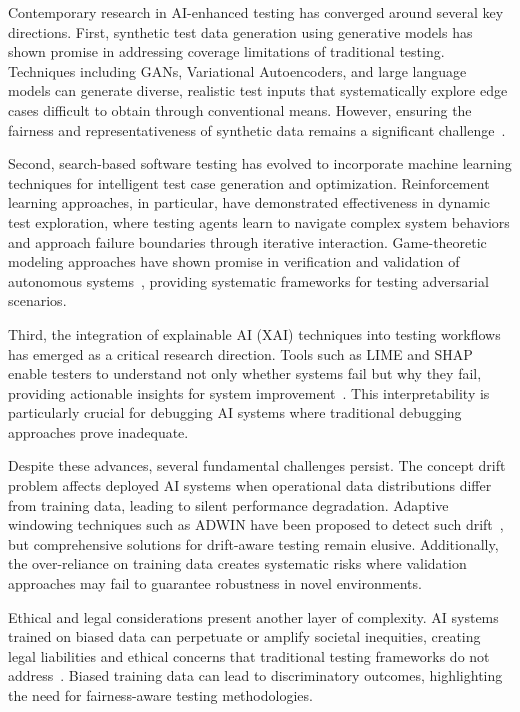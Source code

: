 \documentclass[manuscript,screen,review]{acmart}
\begin{document}
Contemporary research in AI-enhanced testing has converged around several key directions. First, synthetic test data generation using generative models has shown promise in addressing coverage limitations of traditional testing. Techniques including GANs, Variational Autoencoders, and large language models can generate diverse, realistic test inputs that systematically explore edge cases difficult to obtain through conventional means. However, ensuring the fairness and representativeness of synthetic data remains a significant challenge~\cite{Kenfack2021}.

Second, search-based software testing has evolved to incorporate machine learning techniques for intelligent test case generation and optimization. Reinforcement learning approaches, in particular, have demonstrated effectiveness in dynamic test exploration, where testing agents learn to navigate complex system behaviors and approach failure boundaries through iterative interaction. Game-theoretic modeling approaches have shown promise in verification and validation of autonomous systems~\cite{Li2018}, providing systematic frameworks for testing adversarial scenarios.

Third, the integration of explainable AI (XAI) techniques into testing workflows has emerged as a critical research direction. Tools such as LIME and SHAP enable testers to understand not only whether systems fail but why they fail, providing actionable insights for system improvement~\cite{Ribeiro2016, Lundberg2017}. This interpretability is particularly crucial for debugging AI systems where traditional debugging approaches prove inadequate.

Despite these advances, several fundamental challenges persist. The concept drift problem affects deployed AI systems when operational data distributions differ from training data, leading to silent performance degradation. Adaptive windowing techniques such as ADWIN have been proposed to detect such drift~\cite{Bifet2007}, but comprehensive solutions for drift-aware testing remain elusive. Additionally, the over-reliance on training data creates systematic risks where validation approaches may fail to guarantee robustness in novel environments.

Ethical and legal considerations present another layer of complexity. AI systems trained on biased data can perpetuate or amplify societal inequities, creating legal liabilities and ethical concerns that traditional testing frameworks do not address~\cite{Zhou2024}. Biased training data can lead to discriminatory outcomes, highlighting the need for fairness-aware testing methodologies.
\end{document}

